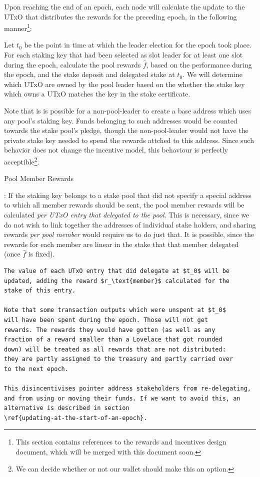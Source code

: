 \documentclass[11pt,a4paper]{article}
\begin{document}
Upon reaching the end of an epoch, each node will calculate the update
to the UTxO that distributes the rewards for the preceding epoch, in the
following manner\footnote{This section contains references to the
  rewards and incentives design document, which will be merged with this
  document soon.}:

Let \(t_0\) be the point in time at which the leader election for the
epoch took place. For each staking key that had been selected as slot
leader for at least one slot during the epoch, calculate the pool
rewards \(\hat{f}\), based on the performance during the epoch, and the
stake deposit and delegated stake at \(t_0\). We will determine which
UTxO are owned by the pool leader based on the whether the stake key
which owns a UTxO matches the key in the stake certificate.

Note that is is possible for a non-pool-leader to create a base address
which uses any pool's staking key. Funds belonging to such addresses
would be counted towards the stake pool's pledge, though the
non-pool-leader would not have the private stake key needed to spend the
rewards attched to this address. Since such behavior does not change the
incentive model, this behaviour is perfectly acceptible\footnote{We can
  decide whether or not our wallet should make this an option.}.

Pool Member Rewards

: If the staking key belongs to a stake pool that did not specify a
special address to which all member rewards should be sent, the pool
member rewards will be calculated \emph{per UTxO entry that delegated to
the pool}. This is necessary, since we do not wish to link together the
addresses of individual stake holders, and sharing rewards \emph{per
pool member} would require us to do just that. It is possible, since the
rewards for each member are linear in the stake that that member
delegated (once \(\hat{f}\) is fixed).

\begin{verbatim}
The value of each UTxO entry that did delegate at $t_0$ will be
updated, adding the reward $r_\text{member}$ calculated for the
stake of this entry.

Note that some transaction outputs which were unspent at $t_0$
will have been spent during the epoch. Those will not get
rewards. The rewards they would have gotten (as well as any
fraction of a reward smaller than a Lovelace that got rounded
down) will be treated as all rewards that are not distributed:
they are partly assigned to the treasury and partly carried over
to the next epoch.

This disincentivises pointer address stakeholders from re-delegating,
and from using or moving their funds. If we want to avoid this, an
alternative is described in section
\ref{updating-at-the-start-of-an-epoch}.
\end{verbatim}
\end{document}
